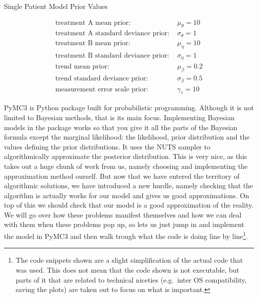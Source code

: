 \documentclass[12pt,a4paper,leqno]{report}
\theoremstyle{plain}
\theoremstyle{definition}
\theoremstyle{remark}
\begin{document}
\begin{table}[H]
    \caption{Single Patient Model Prior Values}\label{singlelpatientmodelpriorvalues}
    \begin{align}\label{}
        \text{treatment A mean prior: } & \mu_{\theta} = 10 \nonumber \\
        \text{treatment A standard deviance prior: } & \sigma_{\theta} = 1 \nonumber \\
        \text{treatment B mean prior: } & \mu_{\eta} = 10 \nonumber \\
        \text{treatment B standard deviance prior: } & \sigma_{\eta} = 1 \nonumber \\
        \text{trend mean prior: } & \mu_{\beta} = 0.2 \nonumber \\
        \text{trend standard deviance prior: } & \sigma_{\beta} = 0.5 \nonumber \\
        \text{measurement error scale prior: } & \gamma_{\tau} = 10 \nonumber
    \end{align}
\end{table}


PyMC3 is Python package built for probabilistic programming. Although it is not
limited to Bayesian methods, that is its main focus. Implementing Bayesian models in
the package works so that you give it all the parts of the Bayesian formula except the
marginal likelihood: the likelihood, prior
distribution and the values defining the prior distributions. It uses the NUTS
sampler\cite{nuts} to algorithmically approximate the posterior distribution. This is
very nice, as this takes out a huge chunk of work from us, namely choosing and
implementing the approximation method
ourself. But now that we have entered the territory of algorithmic solutions, we have
introduced a new hurdle, namely checking that the algorithm is actually works for our
model and gives us good approximations. On top of this we should check that our model is a good
approximation of the reality. We will go over how these problems manifest themselves and
how we can deal with them when these problems pop up, so lets us just jump in and
implement the model in PyMC3 and then walk trough what the code is
doing line by line\footnote{The code snippets shown are a
slight simplification of the actual code that was used. This does not mean
that the code shown is not executable, but parts of it that are related to technical niceties
(e.g.\ inter OS compatibility, saving the plots) are taken out to focus on what is
important.}.
\end{document}
